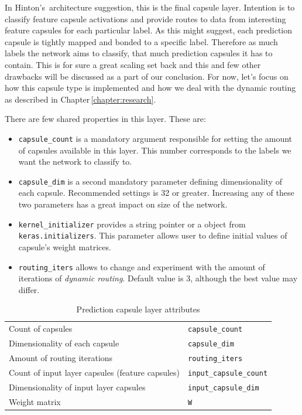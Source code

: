 In Hinton's\,\cite{capsule} architecture suggestion, this is the final capsule layer. Intention is to classify feature capsule activations and provide routes to data from interesting feature capsules
for each particular label. As this might suggest, each prediction capsule is tightly mapped and bonded to a specific label. Therefore as much labels the network aims to classify, that much prediction capsules it has to contain. This is for sure a great scaling set back and this and few other drawbacks will be discussed as a part of our conclusion. For now, let's focus on how this capsule type is implemented and how we deal with the dynamic routing as described in Chapter\,\ref{chapter:research}.

There are few shared properties in this layer. These are:

\begin{itemize}
    \item \texttt{capsule\_count} is a mandatory argument responsible for setting the amount of capsules available in this layer. This number corresponds to the labels we want the network to classify to.
    \item \texttt{capsule\_dim} is a second mandatory parameter defining dimensionality of each capsule. Recommended settings is 32 or greater. Increasing any of these two parameters has a great impact on size of the network.
    \item \texttt{kernel\_initializer} provides a string pointer or a object from \texttt{keras.initializers}. This parameter allows user to define initial values of capsule's weight matrices.
    \item \texttt{routing\_iters} allows to change and experiment with the amount of iterations of \textit{dynamic routing}. Default value is 3, although the best value may differ.
\end{itemize}

\begin{table}[ht]
    \centering
    \begin{tabularx}{.8\textwidth}{l|X}
        \toprule
        Count of capsules & \texttt{capsule\_count} \\
        Dimensionality of each capsule & \texttt{capsule\_dim} \\
        Amount of routing iterations & \texttt{routing\_iters} \\
        Count of input layer capsules (feature capsules) & \texttt{input\_capsule\_count} \\
        Dimensionality of input layer capsules & \texttt{input\_capsule\_dim} \\
        Weight matrix & \texttt{W} \\
        \bottomrule
    \end{tabularx}
    \caption{Prediction capsule layer attributes}
\end{table}

